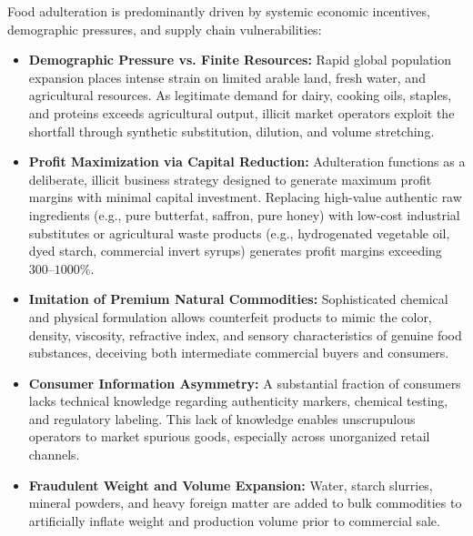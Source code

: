 \documentclass[11pt,a4paper,oneside]{article}
\begin{document}
Food adulteration is predominantly driven by systemic economic incentives, demographic pressures, and supply chain vulnerabilities:
\begin{itemize}[leftmargin=*]
    \item \textbf{Demographic Pressure vs. Finite Resources:} Rapid global population expansion places intense strain on limited arable land, fresh water, and agricultural resources. As legitimate demand for dairy, cooking oils, staples, and proteins exceeds agricultural output, illicit market operators exploit the shortfall through synthetic substitution, dilution, and volume stretching.
    \item \textbf{Profit Maximization via Capital Reduction:} Adulteration functions as a deliberate, illicit business strategy designed to generate maximum profit margins with minimal capital investment. Replacing high-value authentic raw ingredients (e.g., pure butterfat, saffron, pure honey) with low-cost industrial substitutes or agricultural waste products (e.g., hydrogenated vegetable oil, dyed starch, commercial invert syrups) generates profit margins exceeding $300\text{--}1000\%$.
    \item \textbf{Imitation of Premium Natural Commodities:} Sophisticated chemical and physical formulation allows counterfeit products to mimic the color, density, viscosity, refractive index, and sensory characteristics of genuine food substances, deceiving both intermediate commercial buyers and consumers.
    \item \textbf{Consumer Information Asymmetry:} A substantial fraction of consumers lacks technical knowledge regarding authenticity markers, chemical testing, and regulatory labeling. This lack of knowledge enables unscrupulous operators to market spurious goods, especially across unorganized retail channels.
    \item \textbf{Fraudulent Weight and Volume Expansion:} Water, starch slurries, mineral powders, and heavy foreign matter are added to bulk commodities to artificially inflate weight and production volume prior to commercial sale.
\end{itemize}
\end{document}
